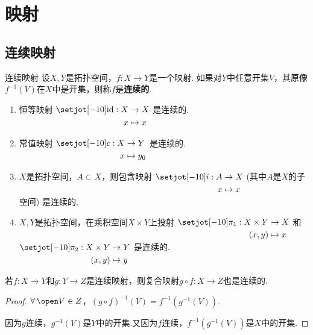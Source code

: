 \chapter{映射}

\section{连续映射}

\begin{definition}{连续映射}
    设$X,Y$是拓扑空间，$f:X\to Y$是一个映射. 如果对$Y$中任意开集$V$，其原像$f^{-1}(V)$在$X$中是开集，则称$f$是\textbf{连续的}.
\end{definition}

\begin{instance}
    \begin{enumerate}
        \item 恒等映射 $\setjot[-10]\begin{aligned}[t]
            \mathrm{id}:X &\to X \\ 
            x &\mapsto x
        \end{aligned}$ 是连续的.
        \item 常值映射 $\setjot[-10]\begin{aligned}[t]
            c:X&\to Y \\ 
            x&\mapsto y_0
        \end{aligned}$ 是连续的.
        \item $X$是拓扑空间，$A\subset X$，则包含映射 $\setjot[-10]\begin{aligned}[t]
            i:A &\to X \\ 
            x&\mapsto x
        \end{aligned}$ (其中$A$是$X$的子空间) 是连续的.
        \item $X,Y$是拓扑空间，在乘积空间$X\times Y$上投射 $\setjot[-10]\begin{aligned}[t]
            \pi_1:X\times Y &\to X \\ 
            (x,y)&\mapsto x
        \end{aligned}$ 和 $\setjot[-10]\begin{aligned}[t]
            \pi_2:X\times Y &\to Y \\ 
            (x,y)&\mapsto y
        \end{aligned}$ 是连续的.
    \end{enumerate}
\end{instance}

\begin{lemma}
    若$f:X\to Y$和$g:Y\to Z$是连续映射，则复合映射$g\circ f:X\to Z$也是连续的.
\end{lemma}
\begin{proof}
    $\forall\,\open V\in Z$，$(g\circ f)^{-1}(V)=f^{-1}(g^{-1}(V))$.\par 
    因为$g$连续，$g^{-1}(V)$是$Y$中的开集.又因为$f$连续，$f^{-1}(g^{-1}(V))$是$X$中的开集.
\end{proof}

